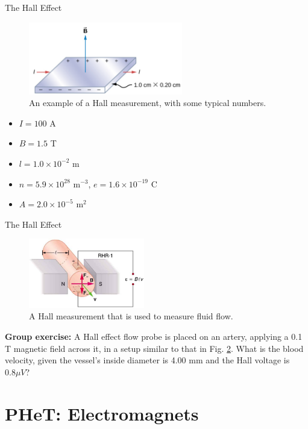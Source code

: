 \documentclass{beamer}
\begin{document}
\begin{frame}{The Hall Effect}
\small
\begin{figure}
\centering
\includegraphics[width=0.6\textwidth]{figures/Hall2.png}
\caption{\label{fig:Hall2} An example of a Hall measurement, with some typical numbers.}
\end{figure}
\begin{itemize}
\item $I = 100$ A
\item $B = 1.5$ T
\item $l = 1.0\times 10^{-2}$ m
\item $n = 5.9 \times 10^{28}$ m$^{-3}$, $e = 1.6 \times 10^{-19}$ C
\item $A = 2.0 \times 10^{-5}$ m$^{2}$
\end{itemize}
\end{frame}

\begin{frame}{The Hall Effect}
\small
\begin{figure}
\centering
\includegraphics[width=0.45\textwidth]{figures/Hall3.png}
\caption{\label{fig:Hall3} A Hall measurement that is used to measure fluid flow.}
\end{figure}
\textbf{Group exercise:} A Hall effect flow probe is placed on an artery, applying a 0.1 T magnetic field across it, in a setup similar to that in Fig. \ref{fig:Hall3}. What is the blood velocity, given the vessel’s inside diameter is 4.00 mm and the Hall voltage is $0.8 \mu V$?
\end{frame}

\section{PHeT: Electromagnets}
\end{document}
